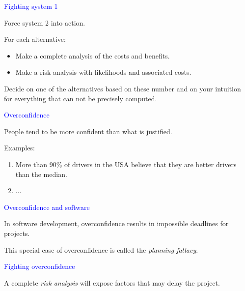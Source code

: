 \documentclass{slides}
\newcommand{\ti}[1]{\begin{center}\Large{\textcolor{blue}{#1}}\end{center}}
\begin{document}
\begin{slide}\ti{Fighting system 1}

Force system 2 into action.

For each alternative:

\begin{itemize}
\item Make a complete analysis of the costs and benefits.
\item Make a risk analysis with likelihoods and associated costs.
\end{itemize}

Decide on one of the alternatives based on these number and on your
intuition for everything that can not be precisely computed.

\vfill\end{slide}
\begin{slide}\ti{Overconfidence}

People tend to be more confident than what is justified.

Examples:

\begin{enumerate}
\item More than 90\% of drivers in the USA believe that they are
  better drivers than the median.
\item ...
\end{enumerate}

\vfill\end{slide}
\begin{slide}\ti{Overconfidence and software}

In software development, overconfidence results in impossible
deadlines for projects.

This special case of overconfidence is called the \emph{planning
  fallacy}. 

\vfill\end{slide}
\begin{slide}\ti{Fighting overconfidence}

A complete \emph{risk analysis} will expose factors that may delay the
project.

\vfill\end{slide}
\end{document}
